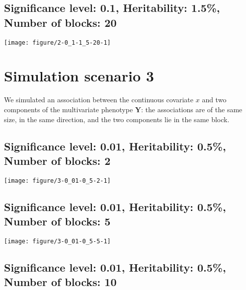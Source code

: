\documentclass[11pt,letter]{article}\usepackage[]{graphicx}\usepackage[]{color}
\makeatletter
\def\maxwidth{ %
  \ifdim\Gin@nat@width>\linewidth
    \linewidth
  \else
    \Gin@nat@width
  \fi
}
\newenvironment{knitrout}{}{} %
\makeatother
\begin{document}
\newpage
\subsection{Significance level: 0.1, Heritability: 1.5\%, Number of blocks: 20}

\begin{knitrout}
\color{fgcolor}
\texttt{[image: figure/2-0\_1-1\_5-20-1]} 

\end{knitrout}

\newpage

\section{Simulation scenario 3}

We simulated an association between the continuous covariate $x$ and two components of the multivariate phenotype $\mathbf{Y}$: the associations are of the same size, in the same direction, and the two components lie in the same block.

\newpage




\subsection{Significance level: 0.01, Heritability: 0.5\%, Number of blocks: 2}

\begin{knitrout}
\color{fgcolor}
\texttt{[image: figure/3-0\_01-0\_5-2-1]} 

\end{knitrout}

\newpage
\subsection{Significance level: 0.01, Heritability: 0.5\%, Number of blocks: 5}

\begin{knitrout}
\color{fgcolor}
\texttt{[image: figure/3-0\_01-0\_5-5-1]} 

\end{knitrout}

\newpage
\subsection{Significance level: 0.01, Heritability: 0.5\%, Number of blocks: 10}
\end{document}
